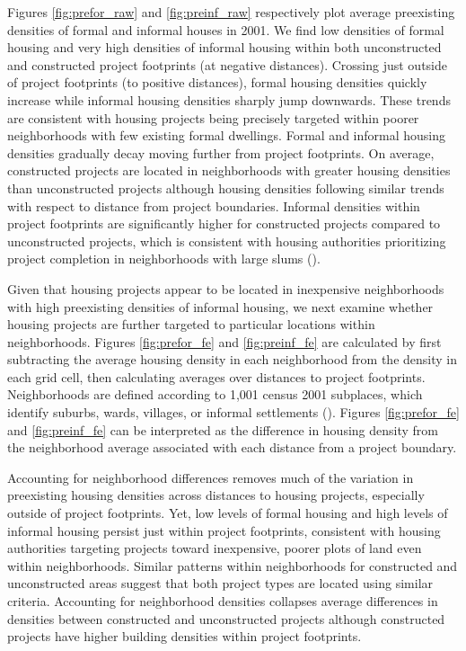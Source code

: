 \documentclass[12pt]{article}
\begin{document}
Figures \ref{fig:prefor_raw} and \ref{fig:preinf_raw} respectively plot average preexisting densities of formal and informal houses in 2001.  We find low densities of formal housing and very high densities of informal housing within both unconstructed and constructed project footprints (at negative distances).  Crossing just outside of project footprints (to positive distances), formal housing densities quickly increase while informal housing densities sharply jump downwards.  These trends are consistent with housing projects being precisely targeted within poorer neighborhoods with few existing formal dwellings.  Formal and informal housing densities gradually decay moving further from project footprints.  On average, constructed projects are located in neighborhoods with greater housing densities than unconstructed projects although housing densities following similar trends with respect to distance from project boundaries.  Informal densities within project footprints are significantly higher for constructed projects compared to unconstructed projects, which is consistent with housing authorities prioritizing project completion in neighborhoods with large slums (\cite{hofmeyr2008risk}).  

Given that housing projects appear to be located in inexpensive neighborhoods with high preexisting densities of informal housing, we next examine whether housing projects are further targeted to particular locations within neighborhoods.  Figures \ref{fig:prefor_fe} and \ref{fig:preinf_fe} are calculated by first subtracting the average housing density in each neighborhood from the density in each grid cell, then calculating averages over distances to project footprints.  Neighborhoods are defined according to 1,001 census 2001 subplaces, which identify suburbs, wards, villages, or informal settlements (\cite{censusmeta}).  Figures \ref{fig:prefor_fe} and \ref{fig:preinf_fe} can be interpreted as the difference in housing density from the neighborhood average associated with each distance from a project boundary.  

Accounting for neighborhood differences removes much of the variation in preexisting housing densities across distances to housing projects, especially outside of project footprints.  Yet, low levels of formal housing and high levels of informal housing persist just within project footprints, consistent with housing authorities targeting projects toward inexpensive, poorer plots of land even within neighborhoods.  Similar patterns within neighborhoods for constructed and unconstructed areas suggest that both project types are located using similar criteria.  Accounting for neighborhood densities collapses average differences in densities between constructed and unconstructed projects although constructed projects have higher building densities within project footprints.  
\end{document}
